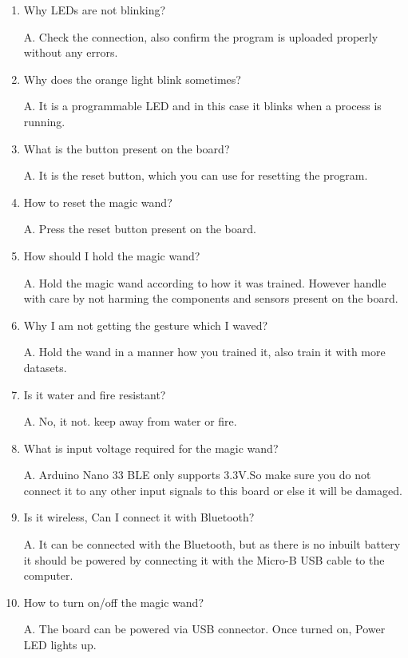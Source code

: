 \begin{enumerate}
    
    \item Why LEDs are not blinking?
    
    A. Check the connection, also confirm the program is uploaded properly without any errors.
    
    \item Why does the orange light blink sometimes?
    
    A. It is a programmable LED and in this case it blinks when a process is running.
    
    \item What is the button present on the board?
    
    A. It is the reset button, which you can use for resetting the program. 
    
    \item How to reset the magic wand?
    
    A. Press the reset button present on the board. 
    
    \item How should I hold the magic wand?
    
    A. Hold the magic wand according to how it was trained. However handle with care by not harming the components and sensors present on the board.
    
    \item Why I am not getting the gesture which I waved?
    
    A. Hold the wand in a manner how you trained it, also train it with more datasets.
    
    \item Is it water and fire resistant?
    
    A. No, it not. keep away from water or fire.
    
    \item What is input voltage required for the magic wand?
    
    A. Arduino Nano 33 BLE only supports 3.3V.So make sure you do not connect it to any other input signals to this board or else it will be damaged. 
    
    \item Is it wireless, Can I connect it with Bluetooth?
    
    A. It can be connected with the Bluetooth, but as there is no inbuilt battery it should be powered by connecting it with the Micro-B USB cable to the computer.
    
    \item How to turn on/off the magic wand?
    
    A. The board can be powered via USB connector. Once turned on, Power LED lights up.
    
\end{enumerate}

